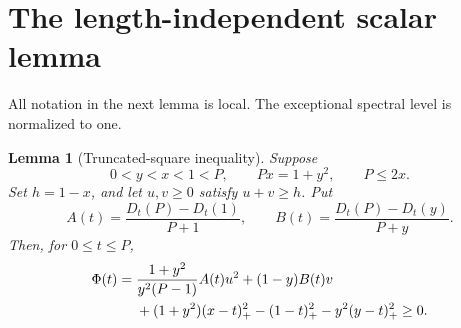 \documentclass[11pt]{article}
\numberwithin{equation}{section}
\newtheorem{lemma}[theorem]{Lemma}
\theoremstyle{remark}
\begin{document}
\section{The length-independent scalar lemma}
All notation in the next lemma is local. The exceptional spectral level is normalized to one.
\begin{lemma}[Truncated-square inequality]\label{lem:scalar}
Suppose
\begin{equation}\label{eq:normalized}
 0<y<x<1<P,\qquad Px=1+y^2,\qquad P\le2x.
\end{equation}
Set $h=1-x$, and let $u,v\ge0$ satisfy $u+v\ge h$. Put
\[
 A(t)=\frac{D_t(P)-D_t(1)}{P+1},\qquad
 B(t)=\frac{D_t(P)-D_t(y)}{P+y}.
\]
Then, for $0\le t\le P$,
\begin{align}\label{eq:Phi}
 \Phi(t)={}&\frac{1+y^2}{y^2(P-1)}A(t)u^2+(1-y)B(t)v\notag\\
 &+(1+y^2)(x-t)_+^2-(1-t)_+^2-y^2(y-t)_+^2
 \ge0.
\end{align}
\end{lemma}
\end{document}

